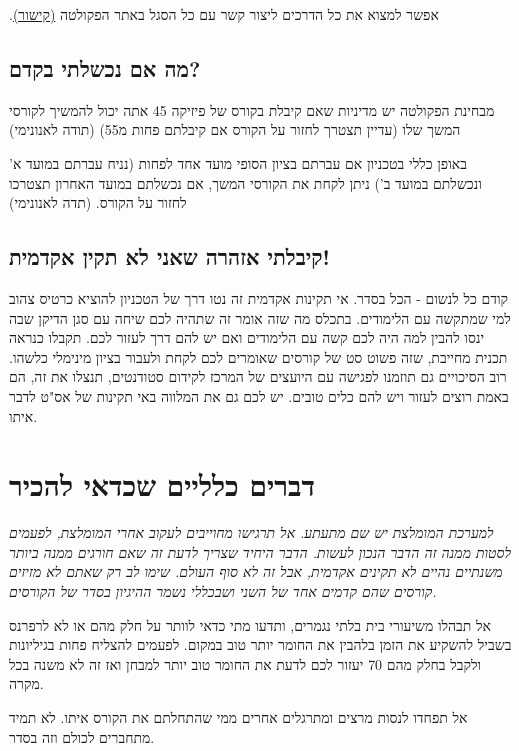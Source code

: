 \documentclass[a4paper,12pt]{article}
\begin{document}
.אפשר למצוא את כל הדרכים ליצור קשר עם כל הסגל באתר הפקולטה \href{https://phys.technion.ac.il/he/undergraduatepage/underg-contact}{(קישור)}

\subsection{מה אם נכשלתי בקדם?}

מבחינת הפקולטה יש מדיניות שאם קיבלת בקורס של פיזיקה 45 אתה יכול להמשיך לקורסי המשך שלו (עדיין תצטרך לחזור על הקורס אם קיבלתם פחות מ55) (תודה לאנונימי)

באופן כללי בטכניון אם עברתם בציון הסופי מועד אחד לפחות (נניח עברתם במועד א' ונכשלתם במועד ב') ניתן לקחת את הקורסי המשך, אם נכשלתם במועד האחרון תצטרכו לחזור על הקורס. (תדה לאנונימי)

\subsection{קיבלתי אזהרה שאני לא תקין אקדמית!}

קודם כל לנשום - הכל בסדר. אי תקינות אקדמית זה נטו דרך של הטכניון להוציא כרטיס צהוב למי שמתקשה עם הלימודים. בתכלס מה שזה אומר זה שתהיה לכם שיחה עם סגן הדיקן שבה ינסו להבין למה היה לכם קשה עם הלימודים ואם יש להם דרך לעזור לכם. תקבלו כנראה תכנית מחייבת, שזה פשוט סט של קורסים שאומרים לכם לקחת ולעבור בציון מינימלי כלשהו. רוב הסיכויים גם תוזמנו לפגישה עם היועצים של המרכז לקידום סטודנטים, תנצלו את זה, הם באמת רוצים לעזור ויש להם כלים טובים. יש לכם גם את המלווה באי תקינות של אס"ט לדבר איתו.

\section{דברים כלליים שכדאי להכיר}

\emph{למערכת המומלצת יש שם מתעתע. אל תרגישו מחוייבים לעקוב אחרי המומלצת, לפעמים לסטות ממנה זה הדבר הנכון לעשות. הדבר היחיד שצריך לדעת זה שאם חורגים ממנה ביותר משנתיים נהיים לא תקינים אקדמית, אבל זה לא סוף העולם. שימו לב רק שאתם לא מזיזים קורסים שהם קדמים אחד של השני ושבכללי נשמר ההיגיון בסדר של הקורסים.}

אל תבהלו משיעורי בית בלתי נגמרים, ותדעו מתי כדאי לוותר על חלק מהם או לא לרפרנס בשביל להשקיע את הזמן בלהבין את החומר יותר טוב במקום. לפעמים להצליח פחות בגיליונות ולקבל בחלק מהם 70 יעזור לכם לדעת את החומר טוב יותר למבחן ואז זה לא משנה בכל מקרה.

אל תפחדו לנסות מרצים ומתרגלים אחרים ממי שהתחלתם את הקורס איתו. לא תמיד מתחברים לכולם וזה בסדר.
\end{document}
